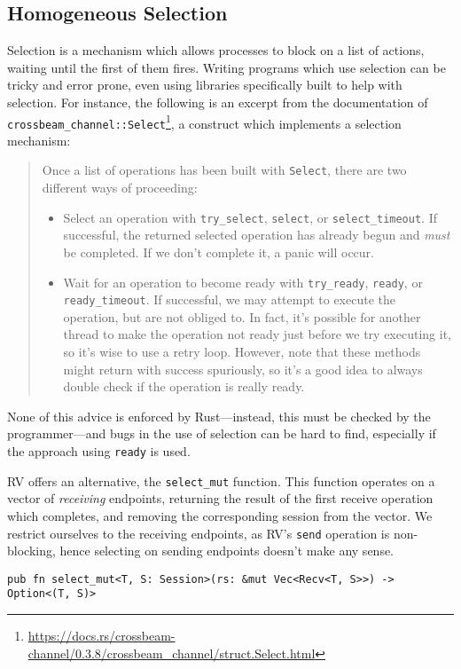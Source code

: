 \documentclass[copyright,creativecommons]{eptcs}
\begin{document}
\subsection{Homogeneous Selection}\label{sec:selection}
Selection is a mechanism which allows processes to block on a list of actions, waiting until the first of them fires. Writing programs which use selection can be tricky and error prone, even using libraries specifically built to help with selection. For instance, the following is an excerpt from the documentation of \lstinline{crossbeam_channel::Select}\footnote{\url{https://docs.rs/crossbeam-channel/0.3.8/crossbeam_channel/struct.Select.html}}, a construct which implements a selection mechanism:
\begin{quotation}
  \noindent
  Once a list of operations has been built with \lstinline{Select}, there are two different ways of proceeding:
  \begin{itemize}
  \item Select an operation with \lstinline{try_select}, \lstinline{select}, or \lstinline{select_timeout}. If successful, the returned selected operation has already begun and \emph{must} be completed. If we don't complete it, a panic will occur.
  \item Wait for an operation to become ready with \lstinline{try_ready}, \lstinline{ready}, or \lstinline{ready_timeout}. If successful, we may attempt to execute the operation, but are not obliged to. In fact, it's possible for another thread to make the operation not ready just before we try executing it, so it's wise to use a retry loop. However, note that these methods might return with success spuriously, so it's a good idea to always double check if the operation is really ready.
  \end{itemize}
\end{quotation}
None of this advice is enforced by Rust---instead, this must be checked by the programmer---and bugs in the use of selection can be hard to find, especially if the approach using \lstinline{ready} is used.

RV offers an alternative, the \lstinline{select_mut} function. This function operates on a vector of \emph{receiving} endpoints, returning the result of the first receive operation which completes, and removing the corresponding session from the vector. We restrict ourselves to the receiving endpoints, as RV's \lstinline{send} operation is non-blocking, hence selecting on sending endpoints doesn't make any sense.
\begin{lstlisting}
pub fn select_mut<T, S: Session>(rs: &mut Vec<Recv<T, S>>) -> Option<(T, S)>
\end{lstlisting}
\end{document}
